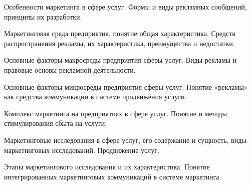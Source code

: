 \documentclass[
	14pt,
	a4paper,
	]
	{scrartcl}
\begin{document}
\newpage


\shapk
{}
\setcounter{zad}{0}

\vfill
\z Особенности маркетинга в сфере услуг.
 \vfill
\z Формы и виды рекламных сообщений, принципы их разработки. 
 \vfill

\vfill

\newpage


\shapk
{}
\setcounter{zad}{0}

\vfill
\z Маркетинговая среда предприятия, понятие общая характеристика.
 \vfill
\z Средств распространения рекламы, их характеристика, преимущества и недостатки.
 \vfill

\vfill

\newpage


\shapk
{}
\setcounter{zad}{0}

\vfill
\z Основные факторы макросреды предприятия сферы услуг. 
 \vfill
\z Виды рекламы и правовые основы рекламной деятельности.
 \vfill

\vfill

\newpage


\shapk
{}
\setcounter{zad}{0}

\vfill
\z Основные факторы микросреды предприятия сферы услуг.
 \vfill
\z Понятие «рекламы» как средства коммуникации в системе продвижения услуги.
 \vfill

\vfill

\newpage


\shapk
{}
\setcounter{zad}{0}

\vfill
\z Комплекс маркетинга на предприятиях в сфере услуг.
 \vfill
\z Понятие и методы стимулирования сбыта на услуги.
 \vfill

\vfill

\newpage


\shapk
{}
\setcounter{zad}{0}

\vfill
\z Маркетинговые исследования в сфере услуг, его содержание и сущность, виды маркетинговых исследований.
 \vfill
\z Продвижение услуг. 
 \vfill

\vfill

\newpage


\shapk
{}
\setcounter{zad}{0}

\vfill
\z Этапы маркетингового исследования и их характеристика.
 \vfill
\z Понятие интегрированных маркетинговых коммуникаций в системе маркетинга.
 \vfill
\end{document}
